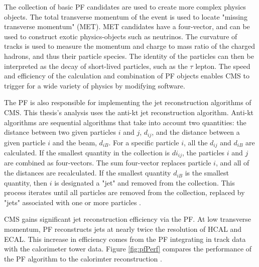The collection of basic PF candidates are used to create more complex physics objects. The total transverse momentum of the event is used to locate "missing transverse momentum" (MET). MET candidates have a four-vector, and can be used to construct exotic physics-objects such as neutrinos. The curvature of tracks is used to measure the momentum and charge to mass ratio of the charged hadrons, and thus their particle species. The identity of the particles can then be interpreted as the decay of short-lived particles, such as the $\tau$ lepton. The speed and efficiency of the calculation and combination of PF objects enables CMS to trigger for a wide variety of physics by modifying software.

The PF is also responsible for implementing the jet reconstruction algorithms of CMS. This thesis's analysis uses the anti-kt jet reconstruction algorithm. Anti-kt algorithms are sequential algorithms that take into account two quantities: the distance between two given particles $i$ and $j$, $d_{ij}$, and the distance between a given particle $i$ and the beam, $d_{iB}$. For a specific particle $i$, all the $d_{ij}$ and $d_{iB}$ are calculated. If the smallest quantity in the collection is $di_{ij}$, the particles $i$ and $j$ are combined as four-vectors. The sum four-vector replaces particle $i$, and all of the distances are recalculated. If the smallest quantity $d_{iB}$ is the smallest quantity, then $i$ is designated a "jet" and removed from the collection. This process iterates until all particles are removed from the collection, replaced by "jets" associated with one or more particles \cite{Ellis:1993tq}.

CMS gains significant jet reconstruction efficiency via the PF. At low transverse momentum, PF reconstructs jets at nearly twice the resolution of HCAL and ECAL. This increase in efficiency comes from the PF integrating in track data with the calorimeter tower data. Figure \ref{fig:pfPerf} compares the performance of the PF algorithm to the calorimter reconstruction \cite{Sirunyan:2017ulk}.

